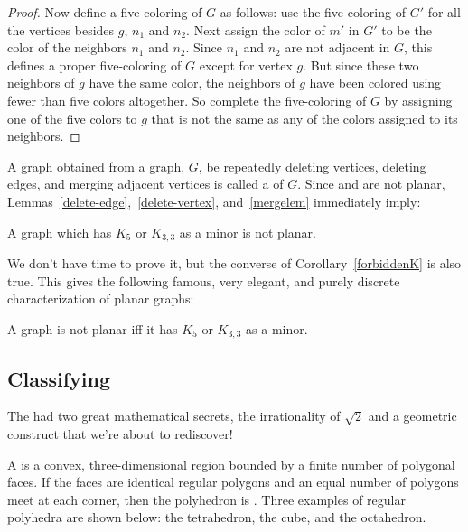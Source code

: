 \begin{proof}
Now define a five coloring of $G$ as follows: use the five-coloring of $G'$
for all the vertices besides $g$, $n_1$ and $n_2$.  Next assign the color
of $m'$ in $G'$ to be the color of the neighbors $n_1$ and $n_2$.  Since
$n_1$ and $n_2$ are not adjacent in $G$, this defines a proper
five-coloring of $G$ except for vertex $g$.  But since these two neighbors
of $g$ have the same color, the neighbors of $g$ have been colored using
fewer than five colors altogether.  So complete the five-coloring of $G$ by
assigning one of the five colors to $g$ that is not the same as any of the
colors assigned to its neighbors.

\end{proof}

A graph obtained from a graph, $G$, be repeatedly deleting vertices,
deleting edges, and merging adjacent vertices is called a  of
$G$.  Since  and  are not planar,
Lemmas~\ref{delete-edge},~\ref{delete-vertex}, and~\ref{mergelem}
immediately imply:

\begin{corollary}\label{forbiddenK}
  A graph which has $K_5$ or $K_{3,3}$ as a minor is not planar.
\end{corollary}

We don't have time to prove it, but the converse of
Corollary~\ref{forbiddenK} is also true.  This gives the following famous,
very elegant, and purely discrete characterization of planar graphs:

\begin{theorem}
  A graph is not planar iff it has $K_5$ or $K_{3,3}$ as a minor.
\end{theorem}

\subsection{Classifying }

The  had two great mathematical secrets, the
irrationality of $\sqrt{2}$ and a geometric construct that we're about to
rediscover!

A  is a convex, three-dimensional region bounded by a
finite number of polygonal faces.  If the faces are identical regular
polygons and an equal number of polygons meet at each corner, then the
polyhedron is .  Three examples
of regular polyhedra are shown below: the tetrahedron, the cube, and the
octahedron.

